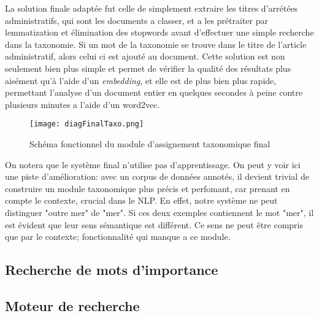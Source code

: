 La solution finale adaptée fut celle de simplement extraire les titres d'arrétées administratifs, qui sont les documents a classer, et a les prétraiter par lemmatization et élimination des stopwords avant d'effectuer une simple recherche dans la taxonomie. Si un mot de la taxonomie se trouve dans le titre de l'article administratif, alors celui ci est ajouté au document. Cette solution est non seulement bien plus simple et permet de vérifier la qualité des résultats plus aisément qu'à l'aide d'un \textit{embedding}, et elle est de plus bien plus rapide, permettant l'analyse d'un document entier en quelques secondes à peine contre plusieurs minutes a l'aide d'un word2vec.

\begin{figure}[h!]
  \centering
  \texttt{[image: diagFinalTaxo.png]}
	\caption[]{Schéma fonctionnel du module d'assignement taxonomique final}
  \label{taxoFinal}
\end{figure}

On notera que le système final n'utilise pas d'apprentissage. On peut y voir ici une piste d'amélioration: avec un corpus de données annotés, il devient trivial de construire un module taxonomique plus précis et perfomant, car prenant en compte le contexte, crucial dans le NLP. En effet, notre système ne peut distinguer "outre mer" de "mer". Si ces deux exemples contiennent le mot "mer", il est évident que leur sens sémantique est différent. Ce sens ne peut être compris que par le contexte; fonctionnalité qui manque a ce module. 

\subsection{Recherche de mots d'importance} %
\subsection{Moteur de recherche} %
